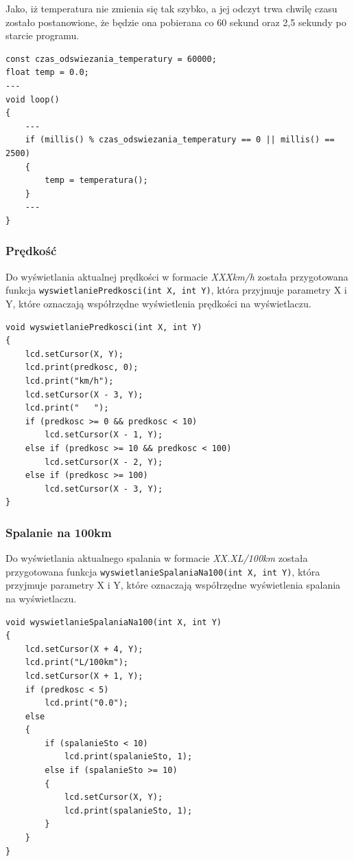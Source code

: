 Jako, iż temperatura nie zmienia się tak szybko, a jej odczyt trwa chwilę czasu zostało postanowione, że będzie ona pobierana co 60 sekund oraz 2,5 sekundy po starcie programu.
\begin{lstlisting}[label=list:temp_refresh_rate,caption=Implementacja odświeżania temperatury,
basicstyle=\footnotesize\ttfamily]
const czas_odswiezania_temperatury = 60000;
float temp = 0.0;
---
void loop()
{
    ---
    if (millis() % czas_odswiezania_temperatury == 0 || millis() == 2500)
    {
        temp = temperatura();
    }
    ---
}

\end{lstlisting}

\subsubsection{Prędkość}
Do wyświetlania aktualnej prędkości w formacie \textit{XXXkm/h} została przygotowana funkcja \texttt{wyswietlaniePredkosci(int X, int Y)}, która przyjmuje parametry X i Y, które oznaczają współrzędne wyświetlenia prędkości na wyświetlaczu.
\begin{lstlisting}[label=list:show_speed,caption=Wyświetlanie prędkości,
basicstyle=\footnotesize\ttfamily]
void wyswietlaniePredkosci(int X, int Y)
{
    lcd.setCursor(X, Y);
    lcd.print(predkosc, 0);
    lcd.print("km/h");
    lcd.setCursor(X - 3, Y);
    lcd.print("   ");
    if (predkosc >= 0 && predkosc < 10)
    	lcd.setCursor(X - 1, Y);
    else if (predkosc >= 10 && predkosc < 100)
    	lcd.setCursor(X - 2, Y);
    else if (predkosc >= 100)
    	lcd.setCursor(X - 3, Y);
}
\end{lstlisting}
\subsubsection{Spalanie na 100km}
Do wyświetlania aktualnego spalania w formacie \textit{XX.XL/100km} została przygotowana funkcja \texttt{wyswietlanieSpalaniaNa100(int X, int Y)}, która przyjmuje parametry X i Y, które oznaczają współrzędne wyświetlenia spalania na wyświetlaczu.
\begin{lstlisting}[label=list:show_fuel_cons_100,caption=Wyświetlanie spalania na 100km,
basicstyle=\footnotesize\ttfamily]
void wyswietlanieSpalaniaNa100(int X, int Y)
{
    lcd.setCursor(X + 4, Y);
    lcd.print("L/100km");
    lcd.setCursor(X + 1, Y);
    if (predkosc < 5)
    	lcd.print("0.0");
    else
    {
    	if (spalanieSto < 10)
    		lcd.print(spalanieSto, 1);
    	else if (spalanieSto >= 10)
    	{
    		lcd.setCursor(X, Y);
    		lcd.print(spalanieSto, 1);
    	}
    }
}
\end{lstlisting}

